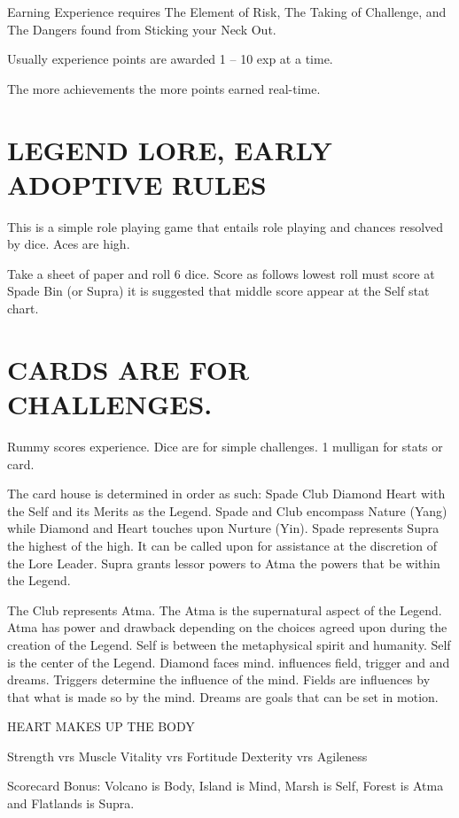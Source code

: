 \documentclass{article}
\begin{document}
Earning Experience requires The Element of Risk, The Taking of Challenge, and The Dangers
found from Sticking your Neck Out.

Usually experience points are awarded 1 – 10 exp at a time.

The more achievements the more points earned real-time.

\section{LEGEND LORE, EARLY ADOPTIVE RULES}

This is a simple role playing game that entails role playing and chances resolved by dice. Aces
are high.

Take a sheet of paper and roll 6 dice. Score as follows lowest roll must score at Spade Bin (or
Supra) it is suggested that middle score appear at the Self stat chart.

\section{CARDS ARE FOR CHALLENGES.}

Rummy scores experience. Dice are for simple challenges.
1 mulligan for stats or card.

The card house is determined in order as such:
Spade Club Diamond Heart with the Self and its Merits as the Legend. Spade and Club
encompass Nature (Yang) while Diamond and Heart touches upon Nurture (Yin).
Spade represents Supra the highest of the high. It can be called upon for assistance at the
discretion of the Lore Leader. Supra grants lessor powers to Atma the powers that be within the
Legend.

The Club represents Atma. The Atma is the supernatural aspect of the Legend. Atma has power
and drawback depending on the choices agreed upon during the creation of the Legend.
Self is between the metaphysical spirit and humanity. Self is the center of the Legend.
Diamond faces mind. influences field, trigger and and dreams. Triggers determine the influence
of the mind. Fields are influences by that what is made so by the mind. Dreams are goals that can
be set in motion.

HEART MAKES UP THE BODY

Strength vrs Muscle
Vitality vrs Fortitude
Dexterity vrs Agileness

Scorecard Bonus: Volcano is Body, Island is Mind, Marsh is Self, Forest is Atma and Flatlands
is Supra.
\end{document}
